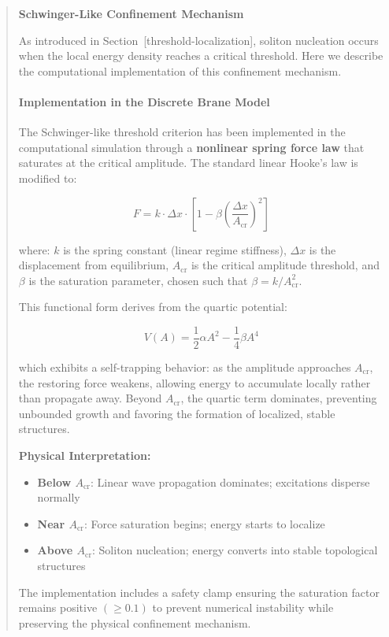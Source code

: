 \documentclass[11pt,a4paper]{article}
\begin{document}
\begin{quote}
\textbf{Schwinger-Like Confinement Mechanism}

As introduced in Section~[threshold-localization], soliton nucleation occurs when
the local energy density reaches a critical threshold. Here we describe the
computational implementation of this confinement mechanism.

\paragraph{Implementation in the Discrete Brane Model}

The Schwinger-like threshold criterion has been implemented in the
computational simulation through a \textbf{nonlinear spring force law}
that saturates at the critical amplitude. The standard linear Hooke's
law is modified to:

\[
F = k \cdot \Delta x \cdot \left[1 - \beta \left(\frac{\Delta x}{A_{\mathrm{cr}}}\right)^2\right]
\]

where: $k$ is the spring constant (linear regime stiffness),
$\Delta x$ is the displacement from equilibrium, $A_{\mathrm{cr}}$
is the critical amplitude threshold, and $\beta$ is the saturation
parameter, chosen such that $\beta = k / A_{\mathrm{cr}}^2$.

This functional form derives from the quartic potential:

\[
V(A) = \frac{1}{2}\alpha A^2 - \frac{1}{4}\beta A^4
\]

which exhibits a self-trapping behavior: as the amplitude approaches
$A_{\mathrm{cr}}$, the restoring force weakens, allowing energy to
accumulate locally rather than propagate away. Beyond
$A_{\mathrm{cr}}$, the quartic term dominates, preventing unbounded
growth and favoring the formation of localized, stable structures.

\textbf{Physical Interpretation:}
\begin{itemize}
\item \textbf{Below $A_{\mathrm{cr}}$}: Linear wave propagation dominates; excitations disperse normally
\item \textbf{Near $A_{\mathrm{cr}}$}: Force saturation begins; energy starts to localize
\item \textbf{Above $A_{\mathrm{cr}}$}: Soliton nucleation; energy converts into stable topological structures
\end{itemize}

The implementation includes a safety clamp ensuring the saturation
factor remains positive $(\geq 0.1)$ to prevent numerical instability
while preserving the physical confinement mechanism.
\end{quote}
\end{document}
